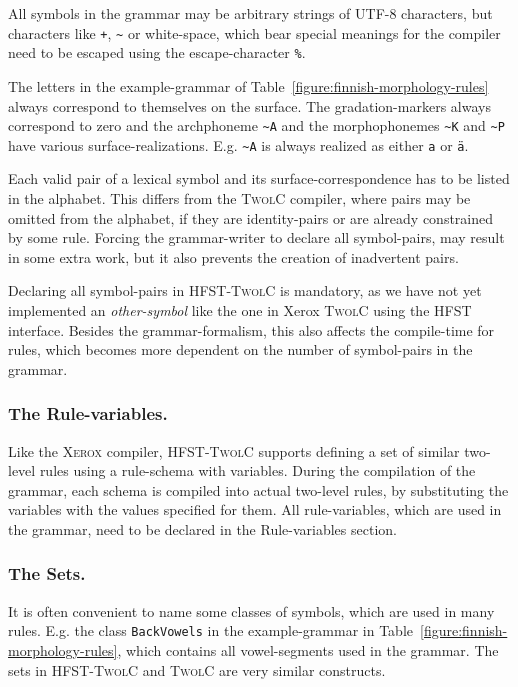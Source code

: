 \documentclass[a4paper]{article}
\begin{document}
All symbols in the grammar may be arbitrary strings of UTF-8
characters, but characters like \verb|+|, \verb|~| or white-space,
which bear special meanings for the compiler need to be escaped using
the escape-character \verb|%|.
 
The letters in the example-grammar of
Table~\ref{figure:finnish-morphology-rules} always correspond to
themselves on the surface. The gradation-markers always correspond to
zero and the archphoneme \verb|~A| and the morphophonemes \verb|~K|
and \verb|~P| have various surface-realizations. E.g. \verb|~A| is
always realized as either \verb|a| or \texttt{\"a}.

Each valid pair of a lexical symbol and its surface-correspondence has
to be listed in the alphabet. This differs from the \textsc{TwolC}
compiler, where pairs may be omitted from the alphabet, if they are
identity-pairs or are already constrained by some rule. Forcing the
grammar-writer to declare all symbol-pairs, may result in some extra
work, but it also prevents the creation of inadvertent pairs.

Declaring all symbol-pairs in \textsc{HFST-TwolC} is mandatory, as we
have not yet implemented an \textit{other-symbol} like the one in
Xerox \textsc{TwolC} \cite{Karttunen92} using the \textsc{HFST}
interface. Besides the grammar-formalism, this also affects the
compile-time for rules, which becomes more dependent on the number of
symbol-pairs in the grammar.
 
\subsubsection{The Rule-variables.}

Like the \textsc{Xerox} compiler, \textsc{HFST-TwolC} supports
defining a set of similar two-level rules using a rule-schema with
variables. During the compilation of the grammar, each schema is
compiled into actual two-level rules, by substituting the variables
with the values specified for them. All rule-variables, which are used
in the grammar, need to be declared in the Rule-variables section.

\subsubsection{The Sets.}

It is often convenient to name some classes of symbols, which are used
in many rules. E.g. the class \verb|BackVowels| in the example-grammar
in Table~\ref{figure:finnish-morphology-rules}, which contains all
vowel-segments used in the grammar. The sets in \textsc{HFST-TwolC}
and \textsc{TwolC} are very similar constructs.
\end{document}
